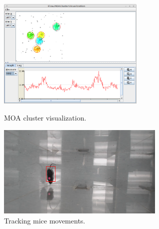 \documentclass[wcp]{jmlr}
\begin{document}
\begin{figure}[htb]
  \begin{minipage}[b]{0.5\linewidth}
  \centering
  \includegraphics[width=7.0cm]{images/cluster_visualization.png}
  \caption{MOA cluster visualization.}
  \label{cluster_visualization}
  \end{minipage}%
  \begin{minipage}[b]{0.5\linewidth}
  \centering
  \includegraphics[width=8.0cm]{images/object_tracking_mouse.png}
  \caption{Tracking mice movements.}
  \label{object_tracking_mouse}
  \end{minipage}
\end{figure}
\end{document}
